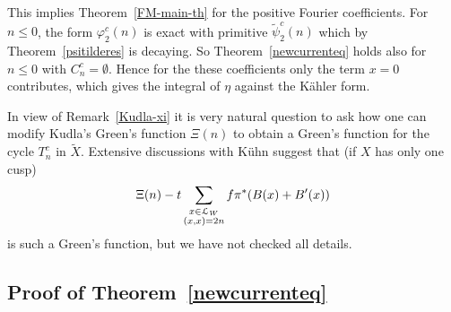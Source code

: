 This implies Theorem~\ref{FM-main-th} for the positive Fourier coefficients. For $n\leq 0$, the form $\varphi^c_{2}(n)$ is exact with primitive $\tilde{\psi}^c_{2}(n)$ which by Theorem~\ref{psitilderes} is decaying. So Theorem~\ref{newcurrenteq} holds also for $n \leq 0$ with $C_n^c = \emptyset$. Hence for the these coefficients only the term $x=0$ contributes, which gives the integral of $\eta$ against the K\"ahler form. 

\begin{remark}\label{Kudla-modification}
In view of Remark~\ref{Kudla-xi} it is very natural question to ask how one can modify Kudla's Green's function $\Xi(n)$ to obtain a Green's function for the cycle $T_n^c$ in $\tilde{X}$. Extensive discussions with K\"uhn suggest that (if $X$ has only one cusp) 
\[
\Xi(n) - t \sum_{\substack{x \in \mathcal{L}_W\\ (x,x)=2n}} f \pi^{\ast}(B(x)+B'(x))
\]
is such a Green's function, but we have not checked all details.
\end{remark}


\subsection{Proof of Theorem~\ref{newcurrenteq} }\label{8.1}

